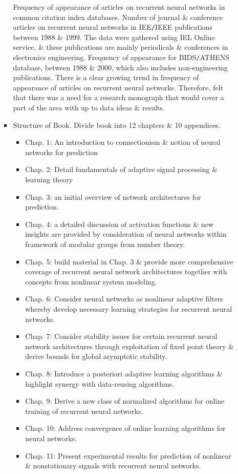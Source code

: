 \documentclass{article}
\begin{document}
\begin{enumerate}
\begin{itemize}
\begin{itemize}
			Frequency of appearance of articles on recurrent neural networks in common citation index databases. Number of journal \& conference articles on recurrent neural networks in IEE{\tt/}IEEE publications between 1988 \& 1999. The data were gathered using IEL Online service, \& these publications are mainly periodicals \& conferences in electronics engineering. Frequency of appearance for BIDS{\tt/}ATHENS database, between 1988 \& 2000, which also includes non-engineering publications. There is a clear growing trend in frequency of appearance of articles on recurrent neural networks. Therefore, felt that there was a need for a research monograph that would cover a part of the area with up to data ideas \& results.
			\item {\sf Structure of Book.} Divide book into 12 chapters \& 10 appendices.
			\begin{itemize}
				\item Chap. 1: An introduction to connectionism \& notion of neural networks for prediction
				\item Chap. 2: Detail fundamentals of adaptive signal processing \& learning theory
				\item Chap. 3: an initial overview of network architectures for prediction.
				\item Chap. 4: a detailed discussion of activation functions \& new insights are provided by consideration of neural networks within framework of modular groups from number theory.
				\item Chap. 5: build material in Chap. 3 \& provide more comprehensive coverage of recurrent neural network architectures together with concepts from nonlinear system modeling.
				\item Chap. 6: Consider neural networks as nonlinear adaptive filters whereby develop necessary learning strategies for recurrent neural networks.
				\item Chap. 7: Consider stability issues for certain recurrent neural network architectures through exploitation of fixed point theory \& derive bounds for global asymptotic stability.
				\item Chap. 8: Introduce a posteriori adaptive learning algorithms \& highlight synergy with data-reusing algorithms.
				\item Chap. 9: Derive a new class of normalized algorithms for online training of recurrent neural networks.
				\item Chap. 10: Address convergence of online learning algorithms for neural networks.
				\item Chap. 11: Present experimental results for prediction of nonlinear \& nonstationary signals with recurrent neural networks.

\end{itemize}
\end{itemize}
\end{itemize}
\end{enumerate}
\end{document}
